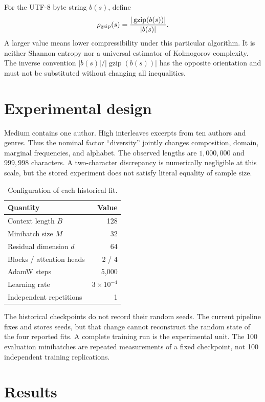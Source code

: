 \documentclass[11pt]{article}
\newcommand{\1}{\mathbf 1}
\begin{document}
For the UTF-8 byte string $b(s)$, define
\[
 \rho_{\rm gzip}(s)=
 \frac{|\operatorname{gzip}(b(s))|}{|b(s)|}.
\]
A larger value means lower compressibility under this particular algorithm. It
is neither Shannon entropy nor a universal estimator of Kolmogorov complexity.
The inverse convention $|b(s)|/|\operatorname{gzip}(b(s))|$ has the opposite
orientation and must not be substituted without changing all inequalities.

\section{Experimental design}

Medium contains one author. High interleaves excerpts from ten authors and
genres. Thus the nominal factor ``diversity'' jointly changes composition,
domain, marginal frequencies, and alphabet. The observed lengths are
$1{,}000{,}000$ and $999{,}998$ characters. A two-character discrepancy is
numerically negligible at this scale, but the stored experiment does not
satisfy literal equality of sample size.

\begin{table}[ht]
\centering
\caption{Configuration of each historical fit.}
\label{tab:config}
\begin{tabular}{lr}
\toprule
Quantity & Value\\
\midrule
Context length $B$ & 128\\
Minibatch size $M$ & 32\\
Residual dimension $d$ & 64\\
Blocks / attention heads & 2 / 4\\
AdamW steps & 5,000\\
Learning rate & $3\times10^{-4}$\\
Independent repetitions & 1\\
\bottomrule
\end{tabular}
\end{table}

The historical checkpoints do not record their random seeds. The current
pipeline fixes and stores seeds, but that change cannot reconstruct the random
state of the four reported fits. A complete training run is the experimental
unit. The 100 evaluation minibatches are repeated measurements of a fixed
checkpoint, not 100 independent training replications.

\section{Results}
\end{document}
